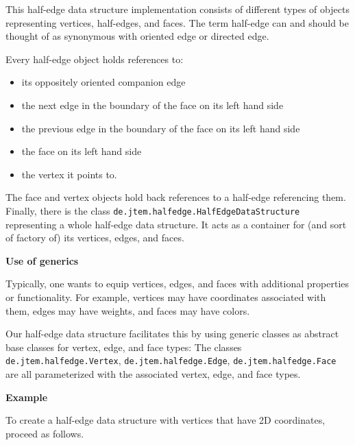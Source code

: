 This half-edge data structure implementation consists of different types of objects representing 
vertices, half-edges, and faces. The term half-edge can and should be thought of as synonymous
with oriented edge or directed edge.

Every half-edge object holds references to:

\begin{itemize}
\item its oppositely oriented companion edge
\item the next edge in the boundary of the face on its left hand side
\item the previous edge in the boundary of the face on its left hand side
\item the face on its left hand side
\item the vertex it points to.
\end{itemize}

The face and vertex objects hold back references to a half-edge referencing them. Finally, there 
is the class {\tt de.jtem.halfedge.HalfEdgeDataStructure} representing a whole half-edge data 
structure. It acts as a container for (and sort of factory of) its vertices, edges, and faces.

{\bf Use of generics}

Typically, one wants to equip vertices, edges, and faces with additional properties or functionality. 
For example, vertices may have coordinates associated with them, edges may have weights, and 
faces may have colors.

Our half-edge data structure facilitates this by using generic classes as abstract base classes for 
vertex, edge, and face types: The classes {\tt de.jtem.halfedge.Vertex}, {\tt de.jtem.halfedge.Edge}, 
{\tt de.jtem.halfedge.Face} are all parameterized with the associated vertex, edge, and face types.

{\bf Example}

To create a half-edge data structure with vertices that have 2D coordinates, proceed as follows.

